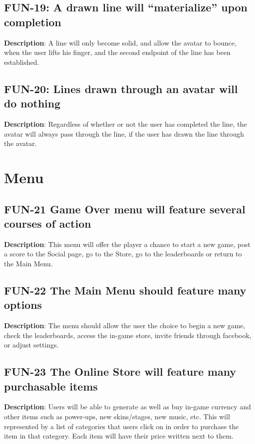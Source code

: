 \subsection{FUN-19: A drawn line will \textquotedblleft{}materialize\textquotedblright{}
upon completion}
\textbf{Description}: A line will only become solid, and allow the
avatar to bounce, when the user lifts his finger, and the second endpoint
of the line has been established.

\subsection{FUN-20: Lines drawn through an avatar will do nothing}
\textbf{Description}: Regardless of whether or not the user has completed
the line, the avatar will always pass through the line, if the user
has drawn the line through the avatar.

\section{Menu}

\subsection{FUN-21 Game Over menu will feature several courses of action}
\textbf{Description}: This menu will offer the player a chance to
start a new game, post a score to the Social page, go to the Store,
go to the leaderboards or return to the Main Menu.

\subsection{FUN-22 The Main Menu should feature many options}
\textbf{Description}: The menu should allow the user the choice to
begin a new game, check the leaderboards, access the in-game store,
invite friends through facebook, or adjust settings.

\subsection{FUN-23 The Online Store will feature many purchasable items}
\textbf{Description}: Users will be able to generate as well as buy
in-game currency and other items such as power-ups, new skins/stages,
new music, etc. This will represented by a list of categories that
users click on in order to purchase the item in that category. Each
item will have their price written next to them.

